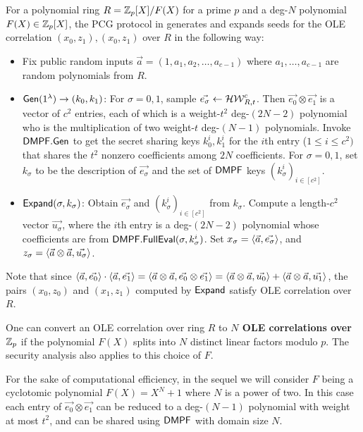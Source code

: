 For a polynomial ring $R = \mathbb{Z}_p[X]/F(X)$ for a prime $p$ and a deg-$N$ polynomial $F(X)\in \mathbb{Z}_p[X]$, the PCG protocol in \cite{cryptoeprint:2022/1035} generates and expands seeds for the OLE correlation $(x_0,z_1),(x_0,z_1)$ over $R$ in the following way: 
\begin{itemize}
    \item Fix public random inputs $\vec{a} = (1, a_1,a_2,\dots,a_{c-1})$ where $a_1,\dots,a_{c-1}$ are random polynomials from $R$. 
    \item ${\sf Gen}(1^\lambda)\rightarrow (k_0,k_1)$: For $\sigma = 0,1$, sample $\vec{e_\sigma}\gets \mathcal{HW}^c_{R,t}$. Then $\vec{e_0}\otimes \vec{e_1}$ is a vector of $c^2$ entries, each of which is a weight-$t^2$ deg-$(2N-2)$ polynomial who is the multiplication of two weight-$t$ deg-$(N-1)$ polynomials. Invoke ${\sf DMPF}.{\sf Gen}$ to get the secret sharing keys $k_0^{i},k_1^i$ for the $i$th entry ($1\le i\le c^2)$ that shares the $t^2$ nonzero coefficients among $2N$ coefficients. For $\sigma = 0,1$, set $k_\sigma$ to be the description of $\vec{e_\sigma}$ and the set of ${\sf DMPF}$ keys $(k_\sigma^i)_{i\in[c^2]}$. 
    \item ${\sf Expand}(\sigma, k_\sigma)$: Obtain $\vec{e_\sigma}$ and $(k_\sigma^i)_{i\in[c^2]}$ from $k_\sigma$. Compute a length-$c^2$ vector $\vec{u_\sigma}$, where the $i$th entry is a deg-$(2N-2)$ polynomial whose coefficients are from ${\sf DMPF}.{\sf FullEval}(\sigma, k_\sigma^i)$. Set $x_\sigma = \langle \vec{a}, \vec{e_\sigma} \rangle$, and $z_\sigma = \langle \vec{a}\otimes\vec{a}, \vec{u_\sigma} \rangle$. 
\end{itemize}
Note that since $\langle \vec{a},  \vec{e_0} \rangle\cdot \langle \vec{a}, \vec{e_1} \rangle = \langle \vec{a}\otimes \vec{a}, \vec{e_0}\otimes \vec{e_1} \rangle = \langle \vec{a}\otimes\vec{a}, \vec{u_0} \rangle + \langle \vec{a}\otimes\vec{a}, \vec{u_1} \rangle$, the pairs $(x_0,z_0)$ and $(x_1,z_1)$ computed by ${\sf Expand}$ satisfy OLE correlation over $R$. 

\begin{remark}\label{rem:use_reducible_ring}
    One can convert an OLE correlation over ring $R$ to \textbf{$N$ OLE correlations over $\mathbb{Z}_p$} if the polynomial $F(X)$ splits into $N$ distinct linear factors modulo $p$\cite{cryptoeprint:2022/1035}. The security analysis also applies to this choice of $F$.  
\end{remark}

For the sake of computational efficiency, in the sequel we will consider $F$ being a cyclotomic polynomial $F(X) = X^N+1$ where $N$ is a power of two. In this case each entry of $\vec{e_0}\otimes \vec{e_1}$ can be reduced to a deg-$(N-1)$ polynomial with weight at most $t^2$, and can be shared using ${\sf DMPF}$ with domain size $N$. 

